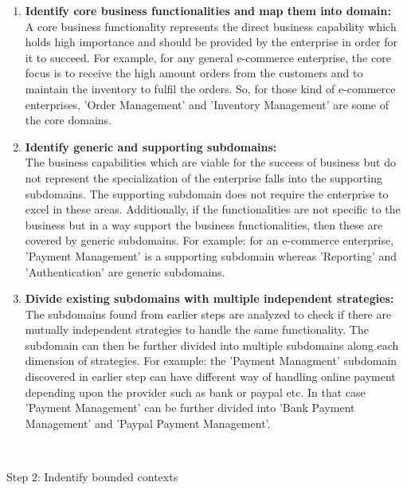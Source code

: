 \begin{enumerate}
\item \textbf{Identify core business functionalities and map them into domain:} \\
A core business functionality represents the direct business capability which holds high importance and should be provided by the enterprise in order for it to succeed. For example, for any general e-commerce enterprise, the core focus is to receive the high amount orders from the customers and to maintain the inventory to fulfil the orders. So, for those kind of e-commerce enterprises, 'Order Management' and 'Inventory Management' are some of the core domains.
\\
\item \textbf{Identify generic and supporting subdomains:} \\
The business capabilities which are viable for the success of business but do not represent the specialization of the enterprise falls into the supporting subdomains. The supporting subdomain does not require the enterprise to excel in these areas. Additionally, if the functionalities are not specific to the business but in a way support the business functionalities, then these are covered by generic subdomains. For example: for an e-commerce enterprise, 'Payment Management' is a supporting subdomain whereas 'Reporting' and 'Authentication' are generic subdomains.\cite{Vernon:2013aa}
\\
\item \textbf{Divide existing subdomains with multiple independent strategies:}\\
The subdomains found from earlier steps are analyzed to check if there are mutually independent strategies to handle the same functionality. The subdomain can then be further divided into multiple subdomains along each dimension of strategies. For example: the 'Payment Managment' subdomain discovered in earlier step can have different way of handling online payment depending upon the provider such as bank or paypal etc. In that case 'Payment Management' can be further divided into 'Bank Payment Management' and 'Paypal Payment Management'.
\end{enumerate}
\\
\begin{shaded}Step 2: Indentify bounded contexts\end{shaded} \label{section:domain_driven_design/process_to_domain_driven_design/strategical_design/step_2}
\\
